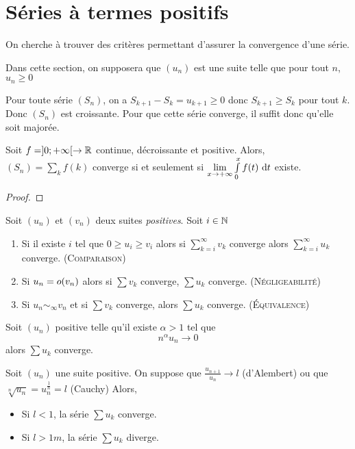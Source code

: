 \section{Séries à termes positifs}\label{serie_th_pos}
On cherche à trouver des critères permettant d'assurer la convergence d'une série.

Dans cette section, on supposera que $(u_n)$ est une suite telle que pour tout $n$, $u_n\geq0$

\begin{rem}
Pour toute série $(S_n)$, on a $S_{k+1}-S_k = u_{k+1}\geq0$ donc $S_{k+1}\geq S_k$ pour tout $k$. Donc $(S_n)$ est croissante. Pour que cette série converge, il suffit donc qu'elle soit majorée.
\end{rem}

\begin{prop}
Soit $f=]0;+\infty[\to\mathbb{R}$ continue, décroissante et positive. Alors, $(S_n) = \sum\limits_k f(k)$ converge si et seulement si $\lim\limits_{x\to+\infty}\int\limits_0^x f(t)\,\,\mathrm{d} t$ existe.
\end{prop}
\begin{proof}\end{proof}

\begin{prop}
Soit $(u_n)$ et $(v_n)$ deux suites \emph{positives}. Soit $i\in\mathbb{N}$
\begin{enumerate}
	\item Si il existe $i$ tel que $0 \geq u_i \geq v_i$ alors si $\sum\limits_{k=i}^\infty v_k$ converge alors $\sum\limits_{k=i}^\infty u_k$ converge. (\textsc{Comparaison})
	\item Si $u_n=o(v_n)$ alors si $\sum v_k$ converge, $\sum u_k$ converge. (\textsc{Négligeabilité})
	\item Si $u_n\sim_\infty v_n$ et si $\sum v_k$ converge, alors $\sum u_k$ converge. (\textsc{Équivalence})
\end{enumerate}
\end{prop}

\begin{prop}
Soit $(u_n)$ positive telle qu'il existe $\alpha > 1$ tel que
$$n^\alpha u_n\to0$$
alors $\sum u_k$ converge.
\end{prop}

\begin{prop}
Soit $(u_n)$ une suite positive.
On suppose que $\frac{u_{n+1}}{u_n}\to l$ (d'Alembert) ou que $\sqrt[n]{u_n}=u^{\frac{1}{n}}_n=l$ (Cauchy)
Alors,
\begin{itemize}
	\item Si $l<1$, la série $\sum u_k$ converge.
	\item Si $l>1m$, la série $\sum u_k$ diverge.
\end{itemize}
\end{prop}

